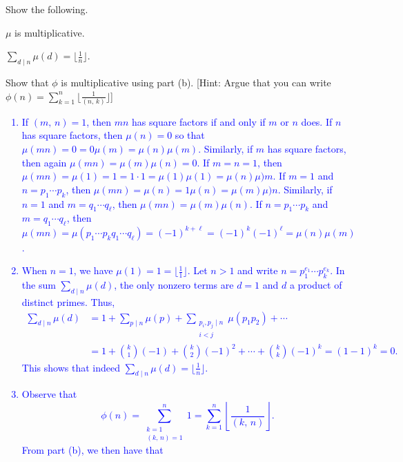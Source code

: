 \documentclass[a4paper,11pt]{article}
\theoremstyle{mythm}
\theoremstyle{mydef}
\newcommand{\blue}[1]{\textcolor{blue}{#1}}
\begin{document}
 Show the following.
\begin{enumerate*}[{\bf (a)}]
\item $\mu$ is multiplicative.
\item $\sum_{d \mid n}\mu(d)=\lfloor \frac{1}{n} \rfloor$.
\item Show that $\phi$ is multiplicative using part (b). [Hint: Argue that you
  can write $\phi(n)=\sum_{k = 1}^n\lfloor \frac{1}{(n,\,k)} \rfloor$]
\end{enumerate*}

\blue{
  \begin{enumerate}[{\bf (a)}]
  \item If $(m,\,n)=1$, then $mn$ has square factors if and only if $m$ or $n$
    does. If $n$ has square factors, then $\mu(n)=0$ so that
    $\mu(mn)=0=0\mu(m)=\mu(n)\mu(m)$. Similarly, if $m$ has square factors, then
    again $\mu(mn)=\mu(m)\mu(n)=0$. If $m=n=1$, then
    $\mu(mn)=\mu(1)=1=1\cdot1=\mu(1)\mu(1)=\mu(n)\mu)m$. If $m=1$ and
    $n=p_1 \cdots p_k$, then $\mu(mn)=\mu(n)=1\mu(n)=\mu(m)\mu)n$.
    Similarly, if $n=1$ and $m=q_1\cdots q_\ell$, then $\mu(mn)=\mu(m)\mu(n)$.
    If $n=p_1 \cdots p_k$ and $m=q_1 \cdots q_\ell$, then $\mu(mn)=\mu(p_1
    \cdots p_kq_1 \cdots q_\ell)=(-1)^{k+\ell}=(-1)^k(-1)^\ell=\mu(n)\mu(m)$.
  \item When $n=1$, we have $\mu(1)=1=\lfloor \frac{1}{1} \rfloor$. Let $n>1$
    and write $n=p_1^{e_1} \cdots p_k^{e_k}$. In the sum $\sum_{d \mid n}\mu(d)$,
    the only nonzero terms are $d=1$ and $d$ a product of distinct primes. Thus,
    \begin{align*}
      \sum_{d \mid n}\mu(d) &= 1+\sum_{p \mid n}\mu(p)+\sum_{\begin{smallmatrix}p_i,p_j \mid n \\ i < j\end{smallmatrix}}\mu(p_1p_2) + \cdots \\
      &= 1 + \binom{k}{1}(-1) + \binom{k}{2}(-1)^2 + \cdots + \binom{k}{k}(-1)^k=(1-1)^k = 0.
    \end{align*}
    This shows that indeed $\sum_{d \mid n}\mu(d) = \lfloor \frac{1}{n} \rfloor$.
  \item Observe that
    \[
      \phi(n) = \sum_{\begin{smallmatrix}k=1 \\ (k,\,n)=1\end{smallmatrix}}^n 1
      = \sum_{k=1}^n \left\lfloor \frac{1}{(k,\,n)} \right\rfloor.
    \]
    From part (b), we then have that
    \begin{align*}

\end{align*}
\end{enumerate}}
\end{document}
